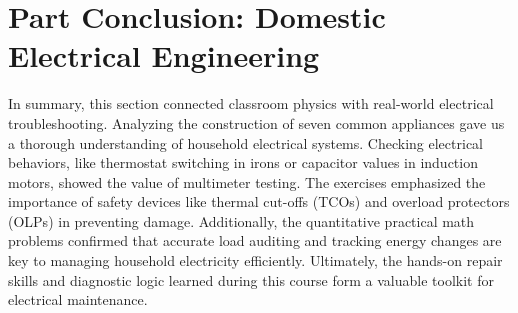 \documentclass[11pt,a4paper]{report}
\begin{document}
\chapter*{Part Conclusion: Domestic Electrical Engineering}
In summary, this section connected classroom physics with real-world electrical troubleshooting. Analyzing the construction of seven common appliances gave us a thorough understanding of household electrical systems. Checking electrical behaviors, like thermostat switching in irons or capacitor values in induction motors, showed the value of multimeter testing. The exercises emphasized the importance of safety devices like thermal cut-offs (TCOs) and overload protectors (OLPs) in preventing damage. Additionally, the quantitative practical math problems confirmed that accurate load auditing and tracking energy changes are key to managing household electricity efficiently. Ultimately, the hands-on repair skills and diagnostic logic learned during this course form a valuable toolkit for electrical maintenance.
\end{document}
